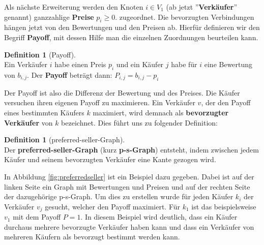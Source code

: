 \documentclass[a4paper]{scrreprt}
\theoremstyle{plain} %
\theoremstyle{definition} %
\newtheorem{definition}[theorem]{Definition}
\begin{document}
\noindent
Als nächste Erweiterung werden den Knoten $i \in V_1$ (ab jetzt ''\textbf{Verkäufer}'' genannt) ganzzahlige 
\textbf{Preise} $p_i\ge0$.
zugeordnet. Die bevorzugten Verbindungen hängen jetzt von den Bewertungen und den Preisen ab. Hierfür
definieren wir den Begriff \textbf{Payoff}, mit dessen Hilfe man die einzelnen Zuordnungen beurteilen kann.

\begin{definition}[Payoff]
~ \\
Ein Verkäufer $i$ habe einen Preis $p_i$ und ein Käufer $j$ habe für $i$ eine Bewertung von $b_{i,j}$.
Der \textbf{Payoff} beträgt dann: $P_{i,j} = b_{i,j} - p_i$
\end{definition}
\noindent
Der Payoff ist also die Differenz der Bewertung und des Preises. Die Käufer versuchen ihren eigenen Payoff zu maximieren.
Ein Verkäufer $v$, der den Payoff eines bestimmten Käufers $k$ maximiert, wird demnach als \textbf{bevorzugter Verkäufer} von $k$ bezeichnet.
Dies führt uns zu folgender Definition:


\begin{definition}[preferred-seller-Graph]  ~\\
Der \textbf{preferred-seller-Graph} (kurz \textbf{p-s-Graph}) entsteht, indem zwischen jedem Käufer und 
seinem bevorzugten Verkäufer eine Kante gezogen wird.
\end{definition}

\newpage
\noindent
In Abbildung \ref{fig:preferredseller} ist ein Beispiel dazu gegeben. Dabei ist
auf der linken Seite ein Graph mit Bewertungen und Preisen und auf der rechten Seite
der dazugehörige p-s-Graph. Um dies zu erstellen wurde für jeden Käufer $k_i$
der Verkäufer $v_j$ gesucht, welcher den Payoff maximiert. Für $k_1$ ist das beispielsweise $v_1$ mit dem
Payoff $P = 1$. In diesem Beispiel wird deutlich, dass ein Käufer durchaus mehrere bevorzugte Verkäufer haben kann
und dass ein Verkäufer von mehreren Käufern als bevorzugt bestimmt werden kann.
\end{document}
